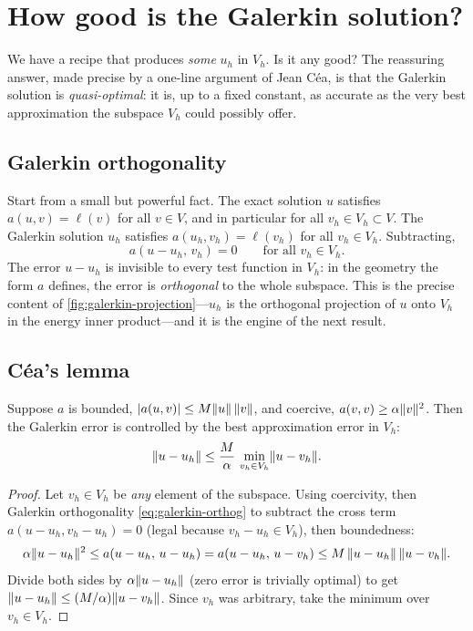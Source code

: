 \section{How good is the Galerkin solution?}
\label{sec:cea}

We have a recipe that produces \emph{some} $u_h$ in $V_h$. Is it any good? The
reassuring answer, made precise by a one-line argument of Jean Céa, is that the
Galerkin solution is \emph{quasi-optimal}: it is, up to a fixed constant, as
accurate as the very best approximation the subspace $V_h$ could possibly offer.

\subsection{Galerkin orthogonality}

Start from a small but powerful fact. The exact solution $u$ satisfies
$a(u,v)=\ell(v)$ for all $v\in V$, and in particular for all $v_h\in V_h\subset V$.
The Galerkin solution $u_h$ satisfies $a(u_h,v_h)=\ell(v_h)$ for all $v_h\in V_h$.
Subtracting,
\begin{equation}
a(u-u_h,\,v_h)=0
\qquad\text{for all } v_h\in V_h.
\label{eq:galerkin-orthog}
\end{equation}
The error $u-u_h$ is invisible to every test function in $V_h$: in the geometry
the form $a$ defines, the error is \emph{orthogonal} to the whole subspace. This
is the precise content of \cref{fig:galerkin-projection}---$u_h$ is the orthogonal
projection of $u$ onto $V_h$ in the energy inner product---and it is the engine of
the next result.

\subsection{Céa's lemma}

\begin{lemma}
Suppose $a$ is bounded, $\lvert a(u,v)\rvert\le M\lVert u\rVert\,\lVert v\rVert$, and coercive,
$a(v,v)\ge\alpha\lVert v\rVert^2$. Then the Galerkin error is controlled by the best
approximation error in $V_h$:
\begin{equation}
\lVert u-u_h\rVert\le\frac{M}{\alpha}\,\min_{v_h\in V_h}\lVert u-v_h\rVert.
\label{eq:cea}
\end{equation}
\end{lemma}

\begin{proof}
Let $v_h\in V_h$ be \emph{any} element of the subspace. Using coercivity, then
Galerkin orthogonality \cref{eq:galerkin-orthog} to subtract the cross term
$a(u-u_h,v_h-u_h)=0$ (legal because $v_h-u_h\in V_h$), then boundedness:
\[
\alpha\lVert u-u_h\rVert^2
\le a(u-u_h,\,u-u_h)
= a(u-u_h,\,u-v_h)
\le M\,\lVert u-u_h\rVert\,\lVert u-v_h\rVert.
\]
Divide both sides by $\alpha\lVert u-u_h\rVert$ (zero error is trivially optimal) to get
$\lVert u-u_h\rVert\le(M/\alpha)\lVert u-v_h\rVert$. Since $v_h$ was arbitrary, take the
minimum over $v_h\in V_h$.
\end{proof}

